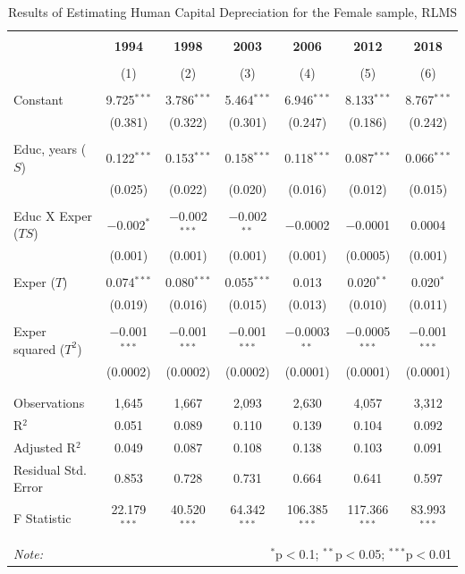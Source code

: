 \documentclass[alpha-refs]{wiley-article-05g}
\begin{document}
\begin{table}[!htbp] \centering 
\caption{Results of Estimating Human Capital Depreciation for the Female sample, RLMS} 
	\label{tab:A1}
\begin{tabular}{@{\extracolsep{5pt}}lcccccc} 
\\[-1.8ex]\hline 
\hline \\[-1.8ex] 
& \textbf{1994} & \textbf{1998} & \textbf{2003} & \textbf{2006} & \textbf{2012} & \textbf{2018} \\ 
\\[-1.8ex] & (1) & (2) & (3) & (4) & (5) & (6)\\ 
\hline \\[-1.8ex] 
 Constant & 9.725$^{***}$ & 3.786$^{***}$ & 5.464$^{***}$ & 6.946$^{***}$ & 8.133$^{***}$ & 8.767$^{***}$ \\ 
  & (0.381) & (0.322) & (0.301) & (0.247) & (0.186) & (0.242) \\ 
  & & & & & & \\ 
 Educ, years ($S$) & 0.122$^{***}$ & 0.153$^{***}$ & 0.158$^{***}$ & 0.118$^{***}$ & 0.087$^{***}$ & 0.066$^{***}$ \\ 
  & (0.025) & (0.022) & (0.020) & (0.016) & (0.012) & (0.015) \\ 
  & & & & & & \\ 
 Educ X Exper ($TS$) & $-$0.002$^{*}$ & $-$0.002$^{***}$ & $-$0.002$^{**}$ & $-$0.0002 & $-$0.0001 & 0.0004 \\ 
  & (0.001) & (0.001) & (0.001) & (0.001) & (0.0005) & (0.001) \\ 
  & & & & & & \\ 
 Exper ($T$) & 0.074$^{***}$ & 0.080$^{***}$ & 0.055$^{***}$ & 0.013 & 0.020$^{**}$ & 0.020$^{*}$ \\ 
  & (0.019) & (0.016) & (0.015) & (0.013) & (0.010) & (0.011) \\ 
  & & & & & & \\ 
 Exper squared ($T^2$) & $-$0.001$^{***}$ & $-$0.001$^{***}$ & $-$0.001$^{***}$ & $-$0.0003$^{**}$ & $-$0.0005$^{***}$ & $-$0.001$^{***}$ \\ 
  & (0.0002) & (0.0002) & (0.0002) & (0.0001) & (0.0001) & (0.0001) \\ 
  & & & & & & \\ 
\hline \\[-1.8ex] 
Observations & 1,645 & 1,667 & 2,093 & 2,630 & 4,057 & 3,312 \\ 
R$^{2}$ & 0.051 & 0.089 & 0.110 & 0.139 & 0.104 & 0.092 \\ 
Adjusted R$^{2}$ & 0.049 & 0.087 & 0.108 & 0.138 & 0.103 & 0.091 \\ 
Residual Std. Error & 0.853 & 0.728 & 0.731 & 0.664 & 0.641 & 0.597 \\ 
F Statistic & 22.179$^{***}$ & 40.520$^{***}$ & 64.342$^{***}$ & 106.385$^{***}$ & 117.366$^{***}$ & 83.993$^{***}$ \\ 
\hline 
\hline \\[-1.8ex] 
\textit{Note:}  & \multicolumn{6}{r}{$^{*}$p$<$0.1; $^{**}$p$<$0.05; $^{***}$p$<$0.01} \\ 
\end{tabular} 
\end{table} 
\end{document}
